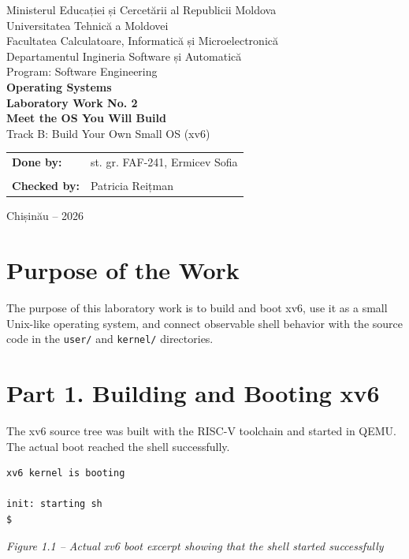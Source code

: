\documentclass[12pt,a4paper]{article}
\newcommand{\figcap}[1]{\begin{center}\small\textit{#1}\end{center}\vspace{0.4em}}
\begin{document}
\begin{titlepage}
\begin{center}
{\large Ministerul Educației și Cercetării al Republicii Moldova}\\[0.3cm]
{\large Universitatea Tehnică a Moldovei}\\[0.3cm]
{\large Facultatea Calculatoare, Informatică și Microelectronică}\\[0.3cm]
{\large Departamentul Ingineria Software și Automatică}\\[0.3cm]
{\large Program: Software Engineering}\\[2.0cm]
{\Large \textbf{Operating Systems}}\\[0.8cm]
{\LARGE \textbf{Laboratory Work No. 2}}\\[0.5cm]
{\Large \textbf{Meet the OS You Will Build}}\\[0.35cm]
{\large Track B: Build Your Own Small OS (xv6)}
\vfill
\begin{flushright}
\begin{tabular}{ll}
\textbf{Done by:} & st. gr. FAF-241, Ermicev Sofia \\
\\
\textbf{Checked by:} & Patricia Reițman
\end{tabular}
\end{flushright}
\vfill
{\large Chișinău -- 2026}
\end{center}
\end{titlepage}
\tableofcontents
\newpage

\section{Purpose of the Work}
The purpose of this laboratory work is to build and boot xv6, use it as a small Unix-like operating system, and connect observable shell behavior with the source code in the \texttt{user/} and \texttt{kernel/} directories.

\section{Part 1. Building and Booting xv6}
The xv6 source tree was built with the RISC-V toolchain and started in QEMU. The actual boot reached the shell successfully.
\begin{lstlisting}
xv6 kernel is booting

init: starting sh
$
\end{lstlisting}
\figcap{Figure 1.1 -- Actual xv6 boot excerpt showing that the shell started successfully}
\end{document}
